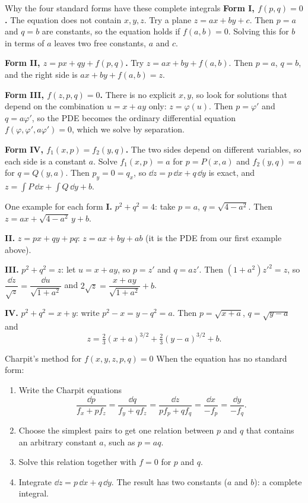 \begin{derivbox}{Why the four standard forms have these complete integrals}
\textbf{Form I, $f(p,q) = 0$.} The equation does not contain $x,y,z$. Try a plane $z = ax + by + c$. Then $p = a$ and $q = b$ are constants, so the equation holds if $f(a,b) = 0$. Solving this for $b$ in terms of $a$ leaves two free constants, $a$ and $c$.

\textbf{Form II, $z = px + qy + f(p,q)$.} Try $z = ax + by + f(a,b)$. Then $p = a$, $q = b$, and the right side is $ax + by + f(a,b) = z$. \checkmark

\textbf{Form III, $f(z,p,q) = 0$.} There is no explicit $x,y$, so look for solutions that depend on the combination $u = x + ay$ only: $z = \varphi(u)$. Then $p = \varphi'$ and $q = a\varphi'$, so the PDE becomes the ordinary differential equation $f(\varphi,\varphi',a\varphi') = 0$, which we solve by separation.

\textbf{Form IV, $f_1(x,p) = f_2(y,q)$.} The two sides depend on different variables, so each side is a constant $a$. Solve $f_1(x,p) = a$ for $p = P(x,a)$ and $f_2(y,q) = a$ for $q = Q(y,a)$. Then $p_y = 0 = q_x$, so $\dd z = p\,\dd x + q\,\dd y$ is exact, and $z = \int P\,\dd x + \int Q\,\dd y + b$.
\end{derivbox}

\begin{examplebox}{One example for each form}
\textbf{I.} $p^2+q^2 = 4$: take $p=a$, $q = \sqrt{4-a^2}$. Then $z = ax + \sqrt{4-a^2}\,y + b$.

\textbf{II.} $z = px + qy + pq$: $z = ax + by + ab$ (it is the PDE from our first example above).

\textbf{III.} $p^2 + q^2 = z$: let $u = x+ay$, so $p = z'$ and $q = az'$. Then $(1+a^2)z'^2 = z$, so $\dfrac{\dd z}{\sqrt z} = \dfrac{\dd u}{\sqrt{1+a^2}}$ and $2\sqrt z = \dfrac{x+ay}{\sqrt{1+a^2}} + b$.

\textbf{IV.} $p^2 + q^2 = x + y$: write $p^2 - x = y - q^2 = a$. Then $p = \sqrt{x+a}$, $q = \sqrt{y-a}$ and
\[ z = \tfrac23(x+a)^{3/2} + \tfrac23(y-a)^{3/2} + b. \]
\end{examplebox}

\begin{methodbox}{Charpit's method for $f(x,y,z,p,q)=0$}
When the equation has no standard form:
\begin{enumerate}
  \item Write the Charpit equations
  \[ \frac{\dd p}{f_x + pf_z} = \frac{\dd q}{f_y + qf_z} = \frac{\dd z}{pf_p + qf_q} = \frac{\dd x}{-f_p} = \frac{\dd y}{-f_q}. \]
  \item Choose the simplest pairs to get one relation between $p$ and $q$ that contains an arbitrary constant $a$, such as $p = aq$.
  \item Solve this relation together with $f=0$ for $p$ and $q$.
  \item Integrate $\dd z = p\,\dd x + q\,\dd y$. The result has two constants ($a$ and $b$): a complete integral.
\end{enumerate}
\end{methodbox}

